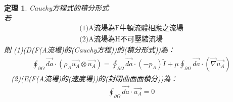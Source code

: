 \documentclass[12pt]{article}
\theoremstyle{upright}
\newtheorem{theorem}{定理}[section]
\begin{document}
\begin{theorem} Cauchy方程式的積分形式
\mbox{}\\[0.3ex]
\noindent 若
\[
\begin{array}{l}
    \text{(1)A流場為F牛頓流體相應之流場}\\
    \text{(2)A流場為H不可壓縮流場}
\end{array}
\]
\noindent 則
(1)\quad (D(F(A流場)的(Cauchy方程))的(積分形式))為：
\begin{equation}\label{eq:cauchyin}\begin{aligned}
    \oint_{\partial \Omega}\vec{da} \cdot\left(\rho_{A} \vec{u_{A}}\otimes \vec{u_{A}}\right) = \oint_{\partial \Omega}\vec{da}\cdot (-p_{A})\overleftrightarrow{I} + \mu \oint_{\partial \Omega} \vec{da} \cdot \left( \vec{\nabla }\vec{u_{A}}\right)
\end{aligned}\end{equation}
\quad \ \ (2)\quad(E(F(A流場)的(速度場))的(封閉曲面面積分))為：
\begin{equation}\begin{aligned}
    \oint_{\partial \Omega} \vec{da} \cdot \vec{u_{A}} = 0 
\end{aligned}\end{equation}
\end{theorem}
\end{document}
